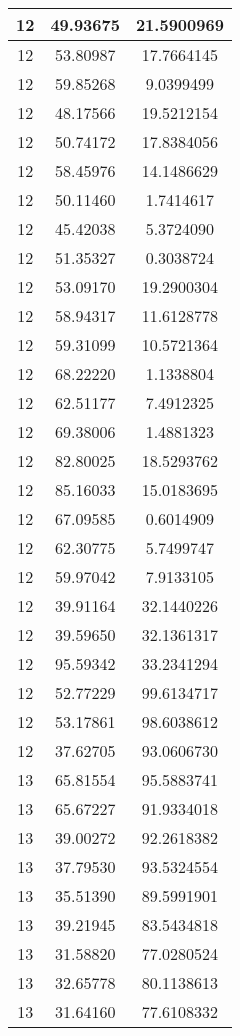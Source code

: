 \documentclass[
]{book}
\begin{document}
\begin{tabular}{c|c|c}
\hline
12 & 49.93675 & 21.5900969\\
\hline
12 & 53.80987 & 17.7664145\\
\hline
12 & 59.85268 & 9.0399499\\
\hline
12 & 48.17566 & 19.5212154\\
\hline
12 & 50.74172 & 17.8384056\\
\hline
12 & 58.45976 & 14.1486629\\
\hline
12 & 50.11460 & 1.7414617\\
\hline
12 & 45.42038 & 5.3724090\\
\hline
12 & 51.35327 & 0.3038724\\
\hline
12 & 53.09170 & 19.2900304\\
\hline
12 & 58.94317 & 11.6128778\\
\hline
12 & 59.31099 & 10.5721364\\
\hline
12 & 68.22220 & 1.1338804\\
\hline
12 & 62.51177 & 7.4912325\\
\hline
12 & 69.38006 & 1.4881323\\
\hline
12 & 82.80025 & 18.5293762\\
\hline
12 & 85.16033 & 15.0183695\\
\hline
12 & 67.09585 & 0.6014909\\
\hline
12 & 62.30775 & 5.7499747\\
\hline
12 & 59.97042 & 7.9133105\\
\hline
12 & 39.91164 & 32.1440226\\
\hline
12 & 39.59650 & 32.1361317\\
\hline
12 & 95.59342 & 33.2341294\\
\hline
12 & 52.77229 & 99.6134717\\
\hline
12 & 53.17861 & 98.6038612\\
\hline
12 & 37.62705 & 93.0606730\\
\hline
13 & 65.81554 & 95.5883741\\
\hline
13 & 65.67227 & 91.9334018\\
\hline
13 & 39.00272 & 92.2618382\\
\hline
13 & 37.79530 & 93.5324554\\
\hline
13 & 35.51390 & 89.5991901\\
\hline
13 & 39.21945 & 83.5434818\\
\hline
13 & 31.58820 & 77.0280524\\
\hline
13 & 32.65778 & 80.1138613\\
\hline
13 & 31.64160 & 77.6108332\\

\end{tabular}
\end{document}

